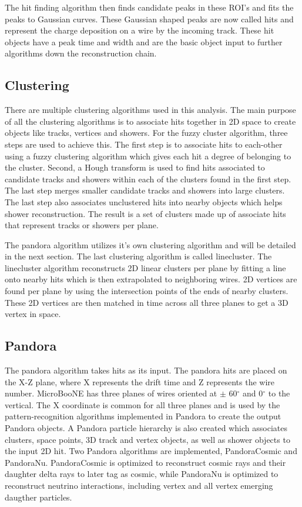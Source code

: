 The hit finding algorithm then finds candidate peaks in these ROI's and fits the peaks to Gaussian curves. These Gaussian shaped peaks are now called hits and represent the charge deposition on a wire by the incoming track. These hit objects have a peak time and width and are the basic object input to further algorithms down the reconstruction chain.   
\subsection{Clustering}
There are multiple clustering algorithms used in this analysis. The main purpose of all the clustering algorithms is to associate hits together in 2D space to create objects like tracks, vertices and showers. For the fuzzy cluster algorithm, three steps are used to achieve this. The first step is to associate hits to each-other using a fuzzy clustering algorithm which gives each hit a degree of belonging to the cluster. Second, a Hough transform is used to find hits associated to candidate tracks and showers within each of the clusters found in the first step. The last step merges smaller candidate tracks and showers into large clusters. The last step also associates unclustered hits into nearby objects which helps shower reconstruction. The result is a set of clusters made up of associate hits that represent tracks or showers per plane. 

The pandora algorithm utilizes it's own clustering algorithm and will be detailed in the next section. The last clustering algorithm is called linecluster. The linecluster algorithm reconstructs 2D linear clusters per plane by fitting a line onto nearby hits which is then extrapolated to neighboring wires. 2D vertices are found per plane by using the intersection points of the ends of nearby clusters. These 2D vertices are then matched in time across all three planes to get a 3D vertex in space.  
\subsection{Pandora}
The pandora algorithm takes hits as its input. The pandora hits are placed on the X-Z plane, where X represents the drift time and Z represents the wire number. MicroBooNE has three planes of wires oriented at $\pm$ 60$^\circ$ and 0$^\circ$ to the vertical. The X coordinate is common for all three planes and is used by the pattern-recognition algorithms implemented in Pandora to create the output Pandora objects. A Pandora particle hierarchy is also created which associates clusters, space points, 3D track and vertex objects, as well as shower objects to the input 2D hit. Two Pandora algorithms are implemented, PandoraCosmic and PandoraNu. PandoraCosmic is optimized to reconstruct cosmic rays and their daughter delta rays to later tag as cosmic, while PandoraNu is optimized to reconstruct neutrino interactions, including vertex and all vertex emerging daugther particles.     
